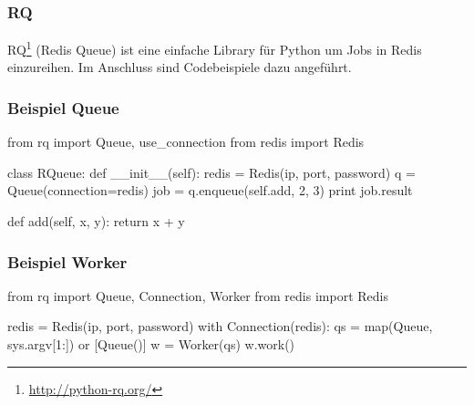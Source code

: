 \subsubsection{RQ}
\Gls{RQ}\footnote{\url{http://python-rq.org/}} (Redis Queue) ist eine einfache Library für Python um Jobs in Redis einzureihen. Im Anschluss sind Codebeispiele dazu angeführt.

\subsubsection{Beispiel Queue}
\begin{python}
from rq import Queue, use_connection
from redis import Redis

class RQueue:
   def __init__(self):
       redis = Redis(ip, port, password)
       q = Queue(connection=redis)
       job = q.enqueue(self.add, 2, 3)
       print job.result

   def add(self, x, y):
       return x + y
\end{python}

\subsubsection{Beispiel Worker}
\begin{python}
from rq import Queue, Connection, Worker
from redis import Redis

redis = Redis(ip, port, password)
with Connection(redis):
   qs = map(Queue, sys.argv[1:]) or [Queue()]
   w = Worker(qs)
   w.work()
\end{python}
\newpage